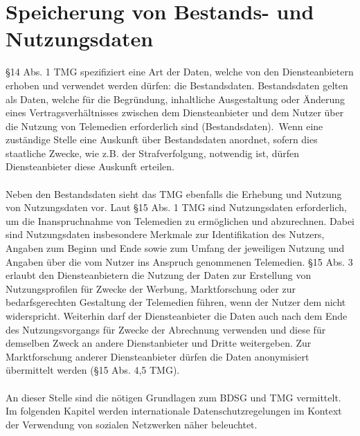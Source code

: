 \section{Speicherung von Bestands- und Nutzungsdaten}
\S 14 Abs. 1 TMG spezifiziert eine Art der Daten, welche von den Diensteanbietern erhoben und verwendet werden dürfen: die Bestandsdaten. Bestandsdaten gelten als Daten, welche \glqq für die Begründung, inhaltliche Ausgestaltung oder Änderung eines Vertragsverhältnisses zwischen dem Diensteanbieter und dem Nutzer über die Nutzung von Telemedien erforderlich sind (Bestandsdaten).\grqq \ Wenn eine zuständige Stelle eine Auskunft über Bestandsdaten anordnet, sofern dies staatliche Zwecke, wie z.B. der Strafverfolgung, notwendig ist, dürfen Diensteanbieter diese Auskunft erteilen.\\
\\Neben den Bestandsdaten sieht das TMG ebenfalls die Erhebung und Nutzung von Nutzungsdaten vor. Laut \S 15 Abs. 1 TMG sind Nutzungsdaten erforderlich, um die Inanspruchnahme von Telemedien zu ermöglichen und abzurechnen. Dabei sind Nutzungsdaten insbesondere Merkmale zur Identifikation des Nutzers, Angaben zum Beginn und Ende sowie zum Umfang der jeweiligen Nutzung und Angaben über die vom Nutzer ins Anspruch genommenen Telemedien. \S 15 Abs. 3 erlaubt den Diensteanbietern die Nutzung der Daten zur Erstellung von Nutzungsprofilen für Zwecke der Werbung, Marktforschung oder zur bedarfsgerechten Gestaltung der Telemedien führen, wenn der Nutzer dem nicht widerspricht. Weiterhin darf der Diensteanbieter die Daten auch nach dem Ende des Nutzungsvorgangs für Zwecke der Abrechnung verwenden und diese für demselben Zweck an andere Dienstanbieter und Dritte weitergeben. Zur Marktforschung anderer Diensteanbieter dürfen die Daten anonymisiert übermittelt werden (\S 15 Abs. 4,5 TMG).\\
\\An dieser Stelle sind die nötigen Grundlagen zum BDSG und TMG vermittelt. Im folgenden Kapitel werden internationale Datenschutzregelungen im Kontext der Verwendung von sozialen Netzwerken näher beleuchtet.